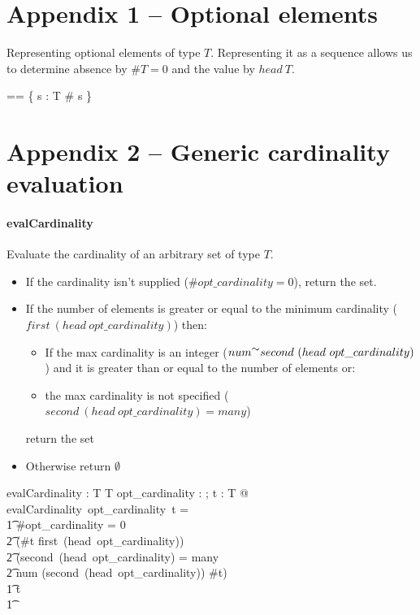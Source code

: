 \documentclass{article}
\begin{document}
   

\section{Appendix 1 -- Optional elements}
Representing optional elements of type $T$.  Representing it as a sequence allows us to
determine absence by $\#T = 0$ and the value by $head~T$. 

\begin{zed} 
  \optional[T] == \{ s : \seq T \mid \# s  \} 
\end{zed}

\section{Appendix 2 -- Generic cardinality evaluation}
\paragraph{evalCardinality}
Evaluate the cardinality of an arbitrary set of type $T$.  
\begin{itemize}[noitemsep,nolistsep]
\item If the cardinality isn't supplied ($\#opt\_cardinality = 0$), return the set.
\item If the number of elements is greater or equal to the minimum cardinality ($first~(head~opt\_cardinality)$) then:
\begin{itemize}[noitemsep,nolistsep]
\item If the max cardinality is an integer ($num \inv second~(head~opt\_cardinality)$) and it is greater than or equal to the number of elements or:
\item the max cardinality is not specified ($second~(head~opt\_cardinality) = many$)
\end{itemize}
return the set
\item Otherwise return $\emptyset$
\end{itemize}

\begin{gendef}[T]
   evalCardinality : \optional[cardinality] \fun \power T \fun \power T
\where
   \forall opt\_cardinality : \optional[cardinality]; t : \power T @ \\
evalCardinality~opt\_cardinality~t = \\
\t1 \IF \#opt\_cardinality = 0 \lor \\
\t2 (\#t \geq first~(head~opt\_cardinality)) \land \\
\t2 (second~(head~opt\_cardinality) = many \lor \\
\t2 num \inv (second~(head~opt\_cardinality)) \geq \#t) \\
\t1 \THEN t \\
\t1 \ELSE  \emptyset
\end{gendef}
\end{document}
